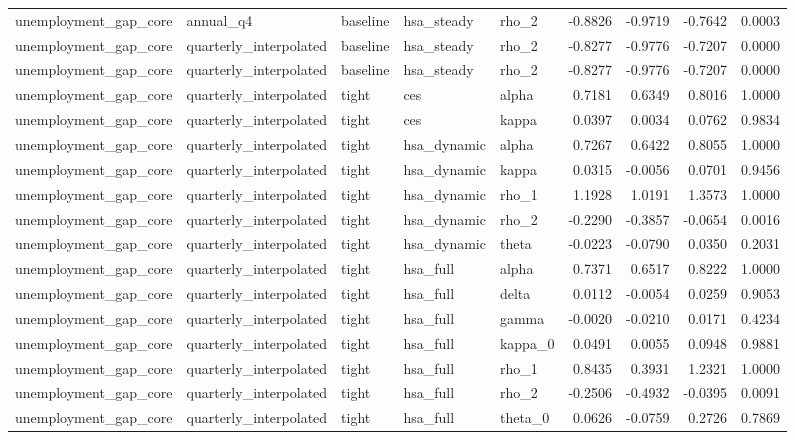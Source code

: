 \begin{tabular}{lllllrrrr}
unemployment\_gap\_core & annual\_q4 & baseline & hsa\_steady & rho\_2 & -0.8826 & -0.9719 & -0.7642 & 0.0003 \\
unemployment\_gap\_core & quarterly\_interpolated & baseline & hsa\_steady & rho\_2 & -0.8277 & -0.9776 & -0.7207 & 0.0000 \\
unemployment\_gap\_core & quarterly\_interpolated & baseline & hsa\_steady & rho\_2 & -0.8277 & -0.9776 & -0.7207 & 0.0000 \\
unemployment\_gap\_core & quarterly\_interpolated & tight & ces & alpha & 0.7181 & 0.6349 & 0.8016 & 1.0000 \\
unemployment\_gap\_core & quarterly\_interpolated & tight & ces & kappa & 0.0397 & 0.0034 & 0.0762 & 0.9834 \\
unemployment\_gap\_core & quarterly\_interpolated & tight & hsa\_dynamic & alpha & 0.7267 & 0.6422 & 0.8055 & 1.0000 \\
unemployment\_gap\_core & quarterly\_interpolated & tight & hsa\_dynamic & kappa & 0.0315 & -0.0056 & 0.0701 & 0.9456 \\
unemployment\_gap\_core & quarterly\_interpolated & tight & hsa\_dynamic & rho\_1 & 1.1928 & 1.0191 & 1.3573 & 1.0000 \\
unemployment\_gap\_core & quarterly\_interpolated & tight & hsa\_dynamic & rho\_2 & -0.2290 & -0.3857 & -0.0654 & 0.0016 \\
unemployment\_gap\_core & quarterly\_interpolated & tight & hsa\_dynamic & theta & -0.0223 & -0.0790 & 0.0350 & 0.2031 \\
unemployment\_gap\_core & quarterly\_interpolated & tight & hsa\_full & alpha & 0.7371 & 0.6517 & 0.8222 & 1.0000 \\
unemployment\_gap\_core & quarterly\_interpolated & tight & hsa\_full & delta & 0.0112 & -0.0054 & 0.0259 & 0.9053 \\
unemployment\_gap\_core & quarterly\_interpolated & tight & hsa\_full & gamma & -0.0020 & -0.0210 & 0.0171 & 0.4234 \\
unemployment\_gap\_core & quarterly\_interpolated & tight & hsa\_full & kappa\_0 & 0.0491 & 0.0055 & 0.0948 & 0.9881 \\
unemployment\_gap\_core & quarterly\_interpolated & tight & hsa\_full & rho\_1 & 0.8435 & 0.3931 & 1.2321 & 1.0000 \\
unemployment\_gap\_core & quarterly\_interpolated & tight & hsa\_full & rho\_2 & -0.2506 & -0.4932 & -0.0395 & 0.0091 \\
unemployment\_gap\_core & quarterly\_interpolated & tight & hsa\_full & theta\_0 & 0.0626 & -0.0759 & 0.2726 & 0.7869 \\

\end{tabular}
